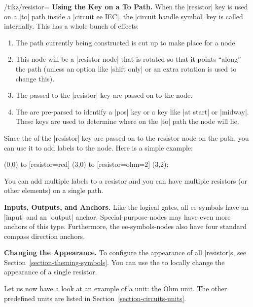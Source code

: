 \begin{key}{/tikz/resistor=}
  \medskip\textbf{Using the Key on a To Path.}
  When the |resistor| key is used on a |to| path inside a
  |circuit ee IEC|, the |circuit handle symbol| key is called
  internally. This has a whole bunch of effects:
  \begin{enumerate}
  \item The path currently being constructed is cut up to make place
    for a node.
  \item This node will be a |resistor node| that is rotated so that it
    points ``along'' the path (unless an option like |shift only| or
    an extra rotation is used to change this).
  \item The  passed to the |resistor| key are passed on
    to the node.
  \item The  are pre-parsed to identify a |pos| key or
    a key like |at start| or |midway|. These keys are used to
    determine where on the |to| path the node will lie.
  \end{enumerate}

  Since the  of the |resistor| key are passed on to the
  resistor node on the path, you can use it to add labels to the
  node. Here is a simple example:

\begin{codeexample}[]
  \draw (0,0) to [resistor=red]        (3,0)
              to [resistor={ohm=2\mu}] (3,2);
\end{codeexample}

  You can add multiple labels to a resistor and you can have multiple
  resistors (or other elements) on a single path.

  \medskip\textbf{Inputs, Outputs, and Anchors.}
  Like the logical gates, all ee-symbols have an |input|
  and an |output| anchor. Special-purpose-nodes may have even more
  anchors of this type. Furthermore, the ee-symbols-nodes also have four
  standard compass direction anchors.

  \medskip\textbf{Changing the Appearance.}
  To configure the appearance of all |resistor|s, see
  Section~\ref{section-theming-symbols}. You can use the
   to locally change the appearance of a single
  resistor.
\end{key}

Let us now have a look at an example of a unit: the Ohm unit. The
other predefined units are listed in Section~\ref{section-circuits-units}.

